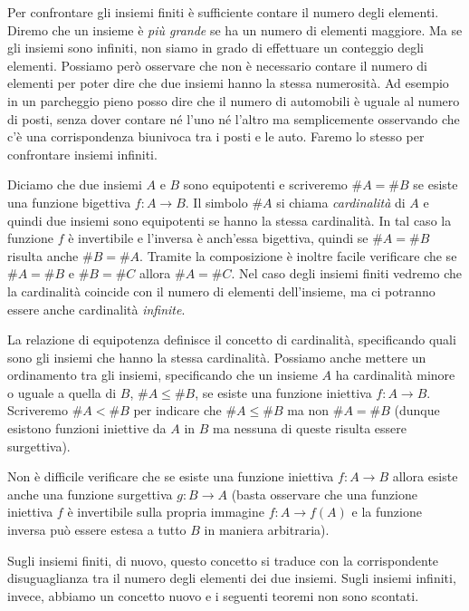 \documentclass[italian,a4paper,hidelinks,headinclude]{scrartcl}
\newcommand{\myemph}[1]{\emph{#1}\marginpar{#1}}
\begin{document}
Per confrontare gli insiemi finiti è sufficiente contare il numero degli elementi.
Diremo che un insieme è \emph{più grande} se ha un numero di elementi maggiore.
Ma se gli insiemi sono infiniti, non siamo in grado di effettuare un conteggio
degli elementi. Possiamo però osservare che non è necessario contare il numero
di elementi per poter dire che due insiemi hanno la stessa numerosità.
Ad esempio in un parcheggio pieno posso dire che il numero di automobili
è uguale al numero di posti, senza dover contare né l'uno né l'altro ma semplicemente
osservando che c'è una corrispondenza biunivoca tra i posti e le auto. Faremo
lo stesso per confrontare insiemi infiniti.

Diciamo che due insiemi $A$ e $B$ sono equipotenti e scriveremo $\#A = \#B$
se esiste una funzione bigettiva $f\colon A \to B$.
Il simbolo $\#A$ si chiama \myemph{cardinalità} di $A$ e quindi due insiemi
sono equipotenti se hanno la stessa cardinalità.
In tal caso la funzione
$f$ è invertibile e l'inversa è anch'essa bigettiva,
quindi se $\#A = \#B$ risulta anche $\#B = \#A$.
Tramite la composizione è inoltre facile verificare che se $\#A = \#B$ e $\#B = \#C$
allora $\#A = \#C$.
Nel caso degli insiemi finiti vedremo che la cardinalità coincide con il
numero di elementi dell'insieme, ma ci potranno essere anche cardinalità
\emph{infinite}.

La relazione di equipotenza definisce il concetto di cardinalità, specificando
quali sono gli insiemi che hanno la stessa cardinalità. Possiamo anche mettere
un ordinamento tra gli insiemi, specificando che un insieme $A$ ha cardinalità
minore o uguale a quella di $B$, $\#A\le \#B$, se esiste una funzione
iniettiva $f\colon A \to B$. Scriveremo $\#A < \#B$ per indicare che
$\#A \le \#B$ ma non $\#A = \#B$ (dunque esistono funzioni iniettive da $A$ in $B$
ma nessuna di queste risulta essere surgettiva).

Non è difficile verificare che se esiste una funzione iniettiva $f\colon A\to B$
allora esiste anche una funzione surgettiva $g\colon B\to A$
(basta osservare che una funzione iniettiva $f$ è invertibile sulla propria
immagine $f\colon A \to f(A)$ e la funzione inversa può essere estesa a
tutto $B$ in maniera arbitraria).

Sugli insiemi finiti, di nuovo, questo concetto
si traduce con la corrispondente
disuguaglianza tra il numero degli elementi dei due insiemi.
Sugli insiemi infiniti, invece, abbiamo un concetto nuovo e i seguenti teoremi
non sono scontati.
\end{document}
